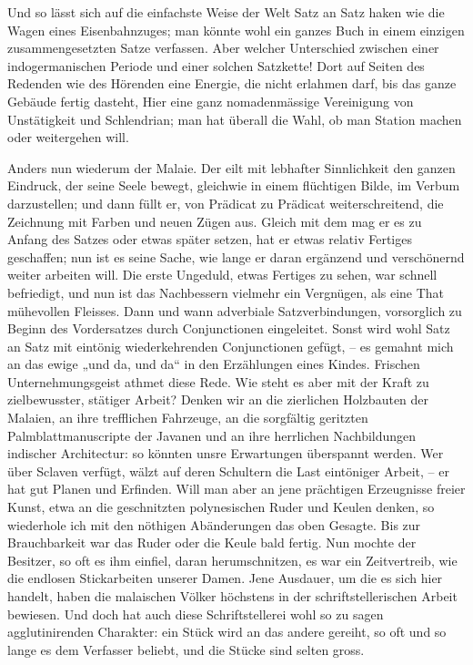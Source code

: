 \noindent Und so lässt sich auf die einfachste Weise der Welt Satz an Satz haken wie die Wagen eines Eisenbahnzuges; man könnte wohl ein ganzes Buch in einem einzigen zusammengesetzten Satze verfassen. Aber welcher Unterschied zwischen einer indogermanischen Periode und einer solchen Satzkette! Dort auf Seiten des Redenden wie des Hörenden eine Energie, die nicht erlahmen darf, bis das ganze Gebäude fertig dasteht, Hier eine ganz nomadenmässige Vereinigung von Unstätigkeit und Schlendrian; man hat überall die Wahl, ob man Station machen oder weitergehen will.

\label{sp.419}

Anders nun wiederum der Malaie. Der eilt mit lebhafter Sinnlichkeit den ganzen Eindruck, der seine Seele bewegt, gleichwie in einem flüchtigen Bilde, im Verbum darzustellen; und dann füllt er, von Prädicat zu Prädicat weiterschreitend, die Zeichnung mit Farben und neuen Zügen aus. Gleich mit dem  mag er es zu Anfang des Satzes oder etwas später setzen, hat er etwas relativ Fertiges geschaffen; nun ist es seine Sache, wie lange er daran ergänzend und verschönernd weiter arbeiten will. Die erste Ungeduld, etwas Fertiges zu sehen, war schnell befriedigt, und nun ist das Nachbessern vielmehr ein Vergnügen, als eine That mühevollen Fleisses. Dann und wann adverbiale Satzverbindungen, \label{fp.398} vorsorglich zu Beginn des Vordersatzes durch Conjunctionen eingeleitet. Sonst wird wohl Satz an Satz mit eintönig wiederkehrenden Conjunctionen gefügt, – es gemahnt mich an das ewige „und da, und da“ in den Erzählungen eines Kindes. Frischen Unternehmungsgeist athmet diese Rede. Wie steht es aber mit der Kraft zu zielbewusster, stätiger Arbeit? Denken wir an die zierlichen Holzbauten der Malaien, an ihre trefflichen Fahrzeuge, an die sorgfältig geritzten Palmblattmanuscripte der Javanen und an ihre herrlichen Nachbildungen indischer Architectur: so könnten unsre Erwartungen überspannt werden. Wer über Sclaven verfügt, wälzt auf deren Schultern die Last eintöniger Arbeit, – er hat gut Planen und Erfinden. Will man aber an jene prächtigen Erzeugnisse freier Kunst, etwa an die geschnitzten polynesischen Ruder und Keulen denken, so wiederhole ich mit den nöthigen Abänderungen das oben Gesagte. Bis zur Brauchbarkeit war das Ruder oder die Keule bald fertig. Nun mochte der Besitzer, so oft es ihm einfiel, daran herumschnitzen, es war ein Zeitvertreib, wie die endlosen Stickarbeiten unserer Damen. Jene Ausdauer, um die es sich hier handelt, haben die malaischen Völker höchstens in der schriftstellerischen Arbeit bewiesen. Und doch hat auch diese Schriftstellerei wohl so zu sagen agglutinirenden Charakter: ein Stück wird an das andere gereiht, so oft und so lange es dem Verfasser beliebt, und die Stücke sind selten gross.

